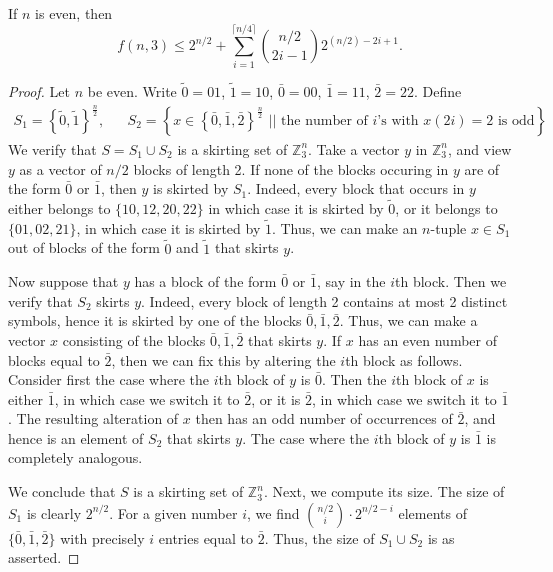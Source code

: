 \documentclass[10pt,a4paper]{amsart}
\newcommand{\ZZ}{\mathbb Z}
\newcommand{\sett}[2]{ \left\{ #1 \, \, || \, \, #2 \right \} }
\begin{document}
\begin{prop}
 If $n$ is even, then
 \[
  f(n,3) \leq 2^{n/2} + \sum_{i=1}^{\lceil n/4 \rceil } \binom{n/2}{2i-1} 2^{(n/2) - 2i + 1}.
 \]
\end{prop}

\begin{proof}
Let $n$ be even.
Write $\tilde 0 = 01$, $\tilde 1 = 10$, $\bar 0 = 00$, $\bar 1 = 11$, $\bar 2 = 22$.
Define
\begin{align*}
 S_1 = \left\{ \tilde 0, \tilde 1 \right \}^{\frac n2}, &&
 S_2 = \sett{ x \in \left \{ \bar 0, \bar 1, \bar 2 \right \}^{\frac n2} }{ \text{the number of $i$'s with $x(2i) = 2$ is odd}}.
\end{align*}
We verify that $S = S_1 \cup S_2$ is a skirting set of $\ZZ_3^n$.
Take a vector $y$ in $\ZZ_3^n$, and view $y$ as a vector of $n/2$ blocks of length 2.
If none of the blocks occuring in $y$ are of the form $\bar 0$ or $\bar 1$, then $y$ is skirted by $S_1$.
Indeed, every block that occurs in $y$ either belongs to $\{10, 12, 20, 22 \}$ in which case it is skirted by $\tilde 0$, or it belongs to $\{01, 02, 21 \}$, in which case it is skirted by $\tilde 1$.
Thus, we can make an $n$-tuple $x \in S_1$ out of blocks of the form $\tilde 0$ and $\tilde 1$ that skirts $y$.

Now suppose that $y$ has a block of the form $\bar 0$ or $\bar 1$, say in the $i$th block.
Then we verify that $S_2$ skirts $y$.
Indeed, every block of length 2 contains at most 2 distinct symbols, hence it is skirted by one of the blocks $\bar 0, \bar 1, \bar 2$.
Thus, we can make a vector $x$ consisting of the blocks $\bar 0, \bar 1, \bar 2$ that skirts $y$.
If $x$ has an even number of blocks equal to $\bar 2$, then we can fix this by altering the $i$th block as follows.
Consider first the case where the $i$th block of $y$ is $\bar 0$.
Then the $i$th block of $x$ is either $\bar 1$, in which case we switch it to $\bar 2$, or it is $\bar 2$, in which case we switch it to $\bar 1$.
The resulting alteration of $x$ then has an odd number of occurrences of $\bar 2$, and hence is an element of $S_2$ that skirts $y$.
The case where the $i$th block of $y$ is $\bar 1$ is completely analogous.

We conclude that $S$ is a skirting set of $\ZZ_3^n$.
Next, we compute its size.
 The size of $S_1$ is clearly $2^{n/2}$.
 For a given number $i$, we find $\binom{n/2}{i} \cdot 2^{n/2-i}$
 elements of $\{ \bar{0}, \bar{1}, \bar{2}\}$ 
 with precisely $i$ entries equal to $\bar{2}$.
 Thus, the size of $S_1 \cup S_2$ is as asserted.
\end{proof}
\end{document}
